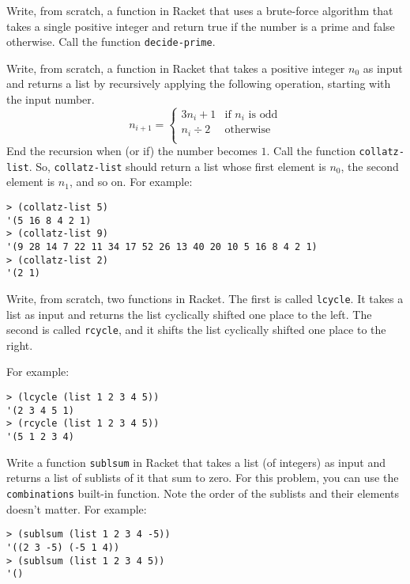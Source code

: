 \documentclass[a4paper, 12pt]{exam}
\begin{document}
\begin{questions}

\question
Write, from scratch, a function in Racket that uses a brute-force algorithm that takes a single positive integer and return true if the number is a prime and false otherwise. Call the function \texttt{decide-prime}.


\question
Write, from scratch, a function in Racket that takes a positive integer $n_0$ as input and returns a list by recursively applying the following operation, starting with the input number.
$$
n_{i+1} =
\left\{
  \begin{array}{ll}
    3n_i + 1 & \textrm{if } n_i \textrm{ is odd}  \\
		n_i \div 2 & \textrm{otherwise} \\
	\end{array}
\right.
$$
End the recursion when (or if) the number becomes $1$.
Call the function \texttt{collatz-list}.
So, \texttt{collatz-list} should return a list whose first element is $n_0$, the second element is $n_1$, and so on.
For example:
\begin{verbatim}
> (collatz-list 5)
'(5 16 8 4 2 1)
> (collatz-list 9)
'(9 28 14 7 22 11 34 17 52 26 13 40 20 10 5 16 8 4 2 1)
> (collatz-list 2)
'(2 1)
\end{verbatim}

\question
Write, from scratch, two functions in Racket.
The first is called \texttt{lcycle}.
It takes a list as input and returns the list cyclically shifted one place to the left.
The second is called \texttt{rcycle}, and it shifts the list cyclically shifted one place to the right.

For example:
\begin{verbatim}
> (lcycle (list 1 2 3 4 5))
'(2 3 4 5 1)
> (rcycle (list 1 2 3 4 5))
'(5 1 2 3 4)
\end{verbatim}


\question
Write a function \texttt{sublsum} in Racket that takes a list (of integers) as input and returns a list of sublists of it that sum to zero.
For this problem, you can use the \texttt{combinations} built-in function.
Note the order of the sublists and their elements doesn't matter.
For example:
\begin{verbatim}
> (sublsum (list 1 2 3 4 -5))
'((2 3 -5) (-5 1 4))
> (sublsum (list 1 2 3 4 5))
'()
\end{verbatim}


\end{questions}
\end{document}
